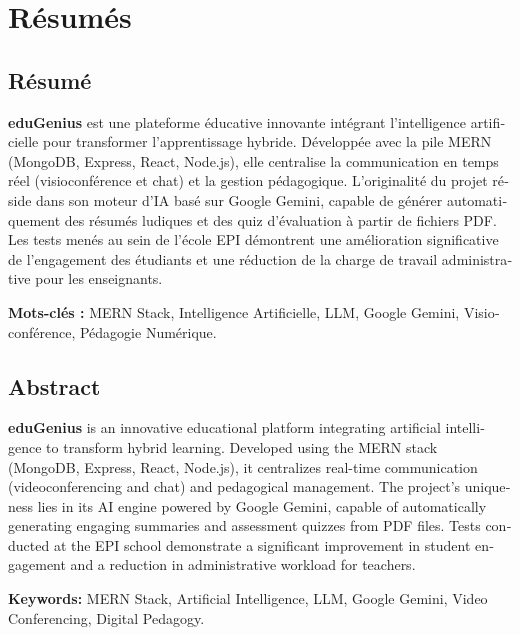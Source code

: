 \chapter*{Résumés}

\begin{otherlanguage}{french}
\section*{Résumé}
\textbf{eduGenius} est une plateforme éducative innovante intégrant l'intelligence artificielle pour transformer l'apprentissage hybride. Développée avec la pile MERN (MongoDB, Express, React, Node.js), elle centralise la communication en temps réel (visioconférence et chat) et la gestion pédagogique. L'originalité du projet réside dans son moteur d'IA basé sur Google Gemini, capable de générer automatiquement des résumés ludiques et des quiz d'évaluation à partir de fichiers PDF. Les tests menés au sein de l'école EPI démontrent une amélioration significative de l'engagement des étudiants et une réduction de la charge de travail administrative pour les enseignants.

\textbf{Mots-clés :} MERN Stack, Intelligence Artificielle, LLM, Google Gemini, Visioconférence, Pédagogie Numérique.
\end{otherlanguage}

\vspace{1cm}

\begin{otherlanguage}{english}
\section*{Abstract}
\textbf{eduGenius} is an innovative educational platform integrating artificial intelligence to transform hybrid learning. Developed using the MERN stack (MongoDB, Express, React, Node.js), it centralizes real-time communication (videoconferencing and chat) and pedagogical management. The project's uniqueness lies in its AI engine powered by Google Gemini, capable of automatically generating engaging summaries and assessment quizzes from PDF files. Tests conducted at the EPI school demonstrate a significant improvement in student engagement and a reduction in administrative workload for teachers.

\textbf{Keywords:} MERN Stack, Artificial Intelligence, LLM, Google Gemini, Video Conferencing, Digital Pedagogy.
\end{otherlanguage}

